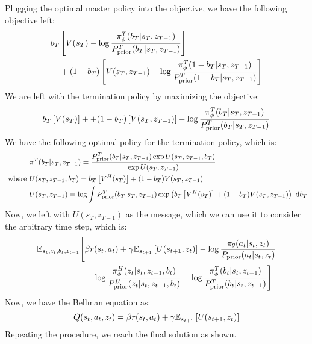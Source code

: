 Plugging the optimal master policy into the objective, we have the following objective left:
\begin{equation}
\begin{aligned}
    b_T&\left[ V(s_T) - \log \frac{\pi^T_{\phi}(b_T | s_T, z_{T-1}) }{P_{\text{prior}}^T(b_T | s_T, z_{T-1})} \right] \\
    &+(1-b_T)\left[ V(s_T, z_{T-1}) - \log \frac{\pi^T_{\phi}(1-b_T | s_T, z_{T-1}) }{P_{\text{prior}}^T(1-b_T | s_T, z_{T-1})}  \right]
\end{aligned}
\end{equation}
We are left with the termination policy by maximizing the objective:
\begin{equation}
    b_T\left[ V(s_T) \right] + +(1-b_T)\left[ V(s_T, z_{T-1}) \right] - \log \frac{\pi^T_{\phi}(b_T | s_T, z_{T-1}) }{P_{\text{prior}}^T(b_T | s_T, z_{T-1})}
\end{equation}
We have the following optimal policy for the termination policy, which is:
\begin{equation}
\begin{aligned}
    &\pi^T(b_T | s_T, z_{T-1}) = \frac{P_{\text{prior}}^T(b_T | s_T, z_{T-1})\exp{U(s_T, z_{T-1}, b_T)}}{\exp U(s_T, z_{T-1})} \\
    \text{ where }& U(s_T, z_{T-1}, b_T) = b_T \left[ V^H(s_T) \right] + (1-b_T)V(s_T, z_{T-1}) \\
    & U(s_T, z_{T-1}) = \log \int P_{\text{prior}}^T(b_T | s_T, z_{T-1})\exp\left( b_T \left[ V^H(s_T) \right] + (1-b_T)V(s_T, z_{T-1}) \right) \ \mathrm{d} b_T
\end{aligned}
\end{equation}
Now, we left with $U(s_T, z_{T-1})$ as the message, which we can use it to consider the arbitrary time step, which is:
\begin{equation*}
\begin{aligned}
    \mathbb{E}_{s_t, z_t, b_t, z_{t-1}}\Bigg[&\beta r(s_t, a_t) + \gamma\mathbb{E}_{s_{t+1}}\left[ U(s_{t+1}, z_t) \right] - \log \frac{\pi_{\theta}(a_t | s_t, z_t)}{P_{\text{prior}}(a_t | s_t, z_t)}  \\
    &- \log \frac{\pi^H_{\phi}(z_t | s_t, z_{t-1}, b_t)}{P_{\text{prior}}^H(z_t | s_t, z_{t-1}, b_t)} - \log \frac{\pi^T_{\phi}(b_t | s_t, z_{t-1}) }{P_{\text{prior}}^T(b_t | s_t, z_{t-1})}\Bigg]
\end{aligned}
\end{equation*}
Now, we have the Bellman equation as:
\begin{equation}
    Q(s_t, a_t, z_t) = \beta r(s_t, a_t) + \gamma\mathbb{E}_{s_{t+1}}\left[ U(s_{t+1}, z_t) \right]
\end{equation}
Repeating the procedure, we reach the final solution as shown. 